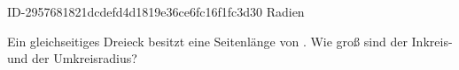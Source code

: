 \begin{exercise}
      {ID-2957681821dcdefd4d1819e36ce6fc16f1fc3d30}
      {Radien}
  \ifproblem\problem\par
    Ein gleichseitiges Dreieck besitzt eine Seitenlänge von .
    Wie groß sind der Inkreis- und der Umkreisradius?
  \fi
\end{exercise}

